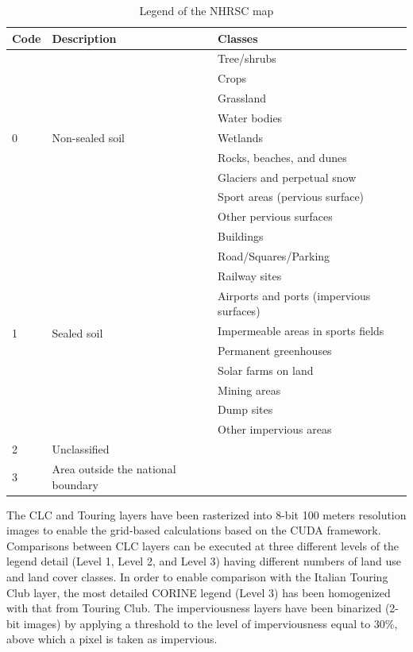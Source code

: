 \documentclass[APA,LATO1COL,doublespace]{WileyNJD-v2}
\begin{document}
\begin{table}
\caption{Legend of the NHRSC map}\label{tab:IMPclasses}
\centering
\begin{tabular}[t]{ l l | l } 
\hline
\textbf{Code} & \textbf{Description} & \textbf{Classes} \\
\hline
\multirow{9}{4em}{0} & \multirow{9}{10em}{Non-sealed soil} & Tree/shrubs \\ 
 &  & Crops \\ 
 &  & Grassland \\ 
 &  & Water bodies \\ 
 &  & Wetlands \\ 
 &  & Rocks, beaches, and dunes \\ 
 &  & Glaciers and perpetual snow \\ 
 &  & Sport areas (pervious surface) \\ 
 &  & Other pervious surfaces \\ 
\hline
\multirow{10}{4em}{1} & \multirow{10}{10em}{Sealed soil} & Buildings \\ 
 &  & Road/Squares/Parking \\ 
 &  & Railway sites \\ 
 &  & Airports and ports (impervious surfaces) \\ 
 &  & Impermeable areas in sports fields \\ 
 &  & Permanent greenhouses \\ 
 &  & Solar farms on land \\ 
 &  & Mining areas \\ 
 &  & Dump sites \\ 
 &  & Other impervious areas \\
\hline
2 & Unclassified & \\
\hline
3 & Area outside the national boundary & \\
\hline
\end{tabular}
\end{table}

The CLC and Touring layers have been rasterized into 8-bit 100 meters resolution images to enable the grid-based calculations based on the CUDA framework.
Comparisons between CLC layers can be executed at three different levels of the legend detail (Level 1, Level 2, and Level 3) having different numbers of land use and land cover classes. 
In order to enable comparison with the Italian Touring Club layer, the most detailed CORINE legend (Level 3) has been homogenized with that from Touring Club. 
The imperviousness layers have been binarized (2-bit images) by applying a threshold to the level of imperviousness equal to 30\%, above which a pixel is taken as impervious.
\end{document}
